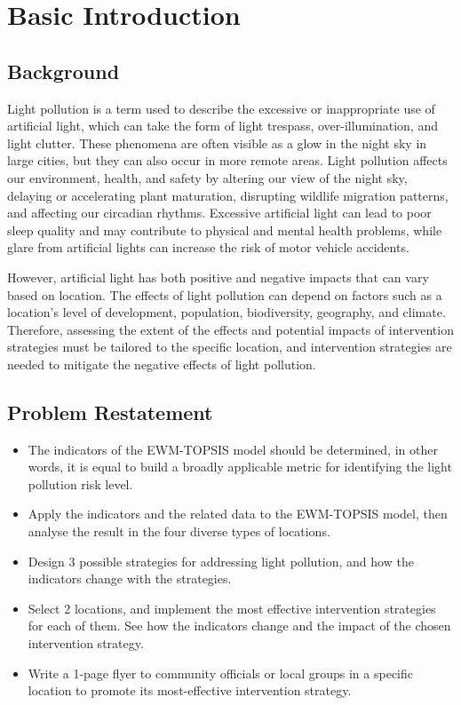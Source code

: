 \MinParskip{}

\section{Basic Introduction}

\subsection{Background}
Light pollution is a term used to describe the excessive or inappropriate use of artificial light, which can take the form of light trespass, over-illumination, and light clutter. These phenomena are often visible as a glow in the night sky in large cities, but they can also occur in more remote areas. Light pollution affects our environment, health, and safety by altering our view of the night sky, delaying or accelerating plant maturation, disrupting wildlife migration patterns, and affecting our circadian rhythms. Excessive artificial light can lead to poor sleep quality and may contribute to physical and mental health problems, while glare from artificial lights can increase the risk of motor vehicle accidents.

However, artificial light has both positive and negative impacts that can vary based on location. The effects of light pollution can depend on factors such as a location's level of development, population, biodiversity, geography, and climate. Therefore, assessing the extent of the effects and potential impacts of intervention strategies must be tailored to the specific location, and intervention strategies are needed to mitigate the negative effects of light pollution.

\subsection{Problem Restatement}
\begin{itemize}
    \item The indicators of the EWM-TOPSIS model should be determined, in other words, it is equal to build a broadly applicable metric for identifying the light pollution risk level.
    \item Apply the indicators and the related data to the EWM-TOPSIS model, then analyse the result in the four diverse types of locations.
    \item Design 3 possible strategies for addressing light pollution, and how the indicators change with the strategies.
    \item Select 2 locations, and implement the most effective intervention strategies for each of them. See how the indicators change and the impact of the chosen intervention strategy.
    \item Write a 1-page flyer to community officials or local groups in a specific location to promote its most-effective intervention strategy.
\end{itemize}

